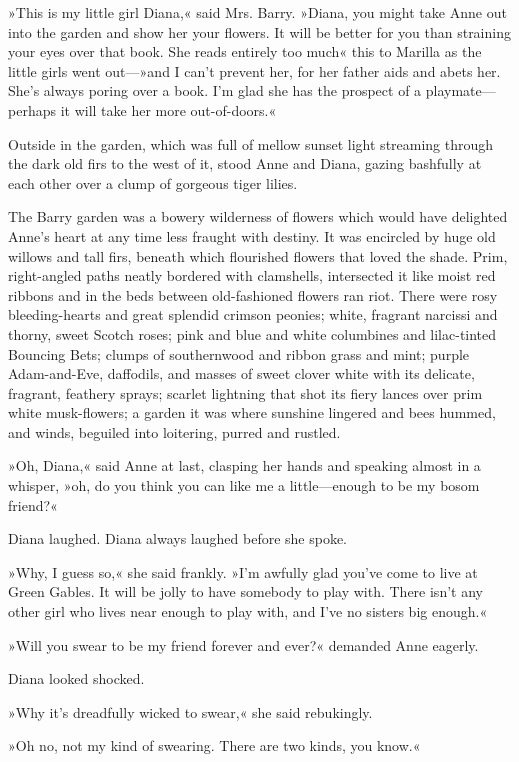 »This is my little girl Diana,« said Mrs. Barry. »Diana, you might take Anne out into the garden and show her your flowers. It will be better for you than straining your eyes over that book. She reads entirely too much\longdash« this to Marilla as the little girls went out—»and I can’t prevent her, for her father aids and abets her. She’s always poring over a book. I’m glad she has the prospect of a playmate—perhaps it will take her more out-of-doors.«

Outside in the garden, which was full of mellow sunset light streaming through the dark old firs to the west of it, stood Anne and Diana, gazing bashfully at each other over a clump of gorgeous tiger lilies.

The Barry garden was a bowery wilderness of flowers which would have delighted Anne’s heart at any time less fraught with destiny. It was encircled by huge old willows and tall firs, beneath which flourished flowers that loved the shade. Prim, right-angled paths neatly bordered with clamshells, intersected it like moist red ribbons and in the beds between old-fashioned flowers ran riot. There were rosy bleeding-hearts and great splendid crimson peonies; white, fragrant narcissi and thorny, sweet Scotch roses; pink and blue and white columbines and lilac-tinted Bouncing Bets; clumps of southernwood and ribbon grass and mint; purple Adam-and-Eve, daffodils, and masses of sweet clover white with its delicate, fragrant, feathery sprays; scarlet lightning that shot its fiery lances over prim white musk-flowers; a garden it was where sunshine lingered and bees hummed, and winds, beguiled into loitering, purred and rustled.

»Oh, Diana,« said Anne at last, clasping her hands and speaking almost in a whisper, »oh, do you think you can like me a little—enough to be my bosom friend?«

Diana laughed. Diana always laughed before she spoke.

»Why, I guess so,« she said frankly. »I’m awfully glad you’ve come to live at Green Gables. It will be jolly to have somebody to play with. There isn’t any other girl who lives near enough to play with, and I’ve no sisters big enough.«

»Will you swear to be my friend forever and ever?« demanded Anne eagerly.

Diana looked shocked.

»Why it’s dreadfully wicked to swear,« she said rebukingly.

»Oh no, not my kind of swearing. There are two kinds, you know.«

